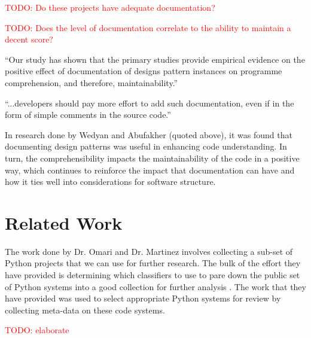 \documentclass[12pt,conference]{IEEEtran}
\newcommand\todo[1]{\textcolor{red}{#1}}
\begin{document}
\todo{TODO: Do these projects have adequate documentation?}

\todo{TODO: Does the level of documentation correlate to the ability to maintain a decent score?}

\vspace{0.25cm}

\begin{displayquote}
``Our study has shown that the primary studies provide empirical evidence on the positive effect of documentation of designs pattern instances on programme comprehension, and therefore, maintainability.''
\end{displayquote}

\begin{displayquote}
``...developers should pay more effort to add such documentation, even if in the form of simple comments in the source code.''
\end{displayquote}

\vspace{0.25cm}

In research done by Wedyan and Abufakher (quoted above), it was found that documenting design patterns was useful in enhancing code understanding. In turn, the comprehensibility impacts the maintainability of the code in a positive way, which continues to reinforce the impact that documentation can have and how it ties well into considerations for software structure.


\vspace{0.5cm}
\section{Related Work}
\vspace{0.25cm}

The work done by Dr. Omari and Dr. Martinez involves collecting a sub-set of Python projects that we can use for further research. The bulk of the effort they have provided is determining which classifiers to use to pare down the public set of Python systems into a good collection for further analysis \cite{omari:2018}. The work that they have provided was used to select appropriate Python systems for review by collecting meta-data on these code systems.

\todo{TODO: elaborate}
\end{document}
